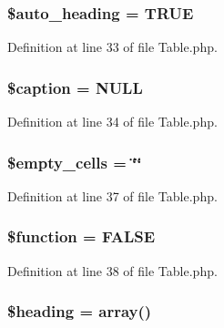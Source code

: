 \subsubsection[{\$auto\-\_\-heading}]{\setlength{\rightskip}{0pt plus 5cm}\$auto\-\_\-heading = T\-R\-U\-E}\label{class_c_i___table_a394ea4ec17bcd63228039d7767bfb092}


Definition at line 33 of file Table.\-php.

\subsubsection[{\$caption}]{\setlength{\rightskip}{0pt plus 5cm}\$caption = N\-U\-L\-L}\label{class_c_i___table_a4f9340ccb02c5d876a448a1d860f3812}


Definition at line 34 of file Table.\-php.

\subsubsection[{\$empty\-\_\-cells}]{\setlength{\rightskip}{0pt plus 5cm}\$empty\-\_\-cells = \char`\"{}\char`\"{}}\label{class_c_i___table_aeba996c863f9ba0e2c9e24d0491bb976}


Definition at line 37 of file Table.\-php.

\subsubsection[{\$function}]{\setlength{\rightskip}{0pt plus 5cm}\$function = F\-A\-L\-S\-E}\label{class_c_i___table_af3e5d0d1ff43879d493dd97bb760c479}


Definition at line 38 of file Table.\-php.

\subsubsection[{\$heading}]{\setlength{\rightskip}{0pt plus 5cm}\$heading = array()}\label{class_c_i___table_a196169be7715d466e3310388b096598c}


